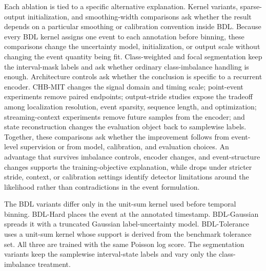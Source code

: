 Each ablation is tied to a specific alternative explanation.
Kernel variants, sparse-output initialization, and smoothing-width comparisons ask whether the result depends on a particular smoothing or calibration convention inside BDL.
Because every BDL kernel assigns one event to each annotation before binning, these comparisons change the uncertainty model, initialization, or output scale without changing the event quantity being fit.
Class-weighted and focal segmentation keep the interval-mask labels and ask whether ordinary class-imbalance handling is enough.
Architecture controls ask whether the conclusion is specific to a recurrent encoder.
CHB-MIT changes the signal domain and timing scale; point-event experiments remove paired endpoints; output-stride studies expose the tradeoff among localization resolution, event sparsity, sequence length, and optimization; streaming-context experiments remove future samples from the encoder; and state reconstruction changes the evaluation object back to samplewise labels.
Together, these comparisons ask whether the improvement follows from event-level supervision or from model, calibration, and evaluation choices.
An advantage that survives imbalance controls, encoder changes, and event-structure changes supports the training-objective explanation, while drops under stricter stride, context, or calibration settings identify detector limitations around the likelihood rather than contradictions in the event formulation.

The BDL variants differ only in the unit-sum kernel used before temporal binning.
BDL-Hard places the event at the annotated timestamp.
BDL-Gaussian spreads it with a truncated Gaussian label-uncertainty model.
BDL-Tolerance uses a unit-sum kernel whose support is derived from the benchmark tolerance set.
All three are trained with the same Poisson log score.
The segmentation variants keep the samplewise interval-state labels and vary only the class-imbalance treatment.

